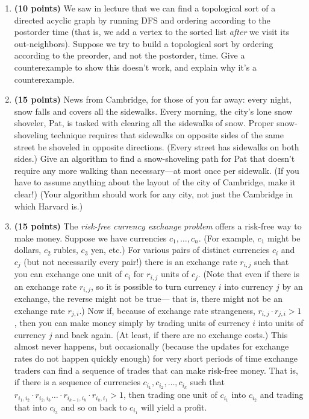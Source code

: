 \documentclass[11pt]{article}
\begin{document}
\begin{enumerate}

\item 
{\bf (10 points)}
We saw in lecture that we can find a topological sort of a directed acyclic graph by running DFS
and ordering according to the postorder time
(that is, we add a vertex to the sorted list \emph{after} we visit its out-neighbors).
Suppose we try to build a topological sort by ordering according to the preorder, and 
not the postorder, time.  Give a counterexample to show this doesn't work, and explain why it's a counterexample.  

\item 
{\bf (15 points)}
News from Cambridge, for those of you far away:
every night, snow falls and covers all the sidewalks.
Every morning, the city's lone snow shoveler, Pat, is tasked with clearing all
the sidewalks of snow. Proper snow-shoveling technique requires that 
sidewalks on opposite sides of the same street be shoveled in opposite directions.
(Every street has sidewalks on both sides.)
Give an algorithm to find a snow-shoveling path for Pat that doesn't require
any more walking than necessary---at most once per sidewalk.
(If you have to assume anything about
the layout of the city of Cambridge, make it clear!)
(Your algorithm should work for any city, not just the Cambridge in which Harvard is.)

\item
{\bf (15 points)}
The {\em risk-free currency exchange problem} offers a risk-free way
to make money.  Suppose we have currencies $c_1,\ldots,c_n$.  (For
example, $c_1$ might be dollars, $c_2$ rubles, $c_3$ yen, etc.)  For
various pairs of distinct currencies $c_i$ and $c_j$ (but not
necessarily every pair!) there is an exchange rate $r_{i,j}$ such that
you can exchange one unit of $c_i$ for $r_{i,j}$ units of $c_j$.
(Note that even if there is an exchange rate $r_{i,j}$, so it is possible to
turn currency $i$ into currency $j$ by an exchange, the reverse might not
be true--- that is, there might
not be an exchange rate $r_{j,i}$.)  Now if, because of exchange rate
strangeness, $r_{i,j} \cdot r_{j,i} > 1$, then you can make money
simply by trading units of currency $i$ into units of currency $j$ and
back again.  (At least, if there are no exchange costs.)  This almost
never happens, but occasionally (because the updates for exchange
rates do not happen quickly enough) for very short periods of time
exchange traders can find a sequence of trades that can make risk-free
money.  That is, if there is a sequence of currencies
$c_{i_1},c_{i_2},\ldots,c_{i_k}$ such that $r_{{i_1},{i_2}} \cdot
r_{{i_2},{i_3}} \ldots \cdot r_{{i_{k-1}},{i_k}} \cdot r_{{i_k},{i_1}}
> 1$, then trading one unit of $c_{i_1}$ into $c_{i_2}$ and trading
that into $c_{i_3}$ and so on back to $c_{i_1}$ will yield a profit.


\end{enumerate}
\end{document}
